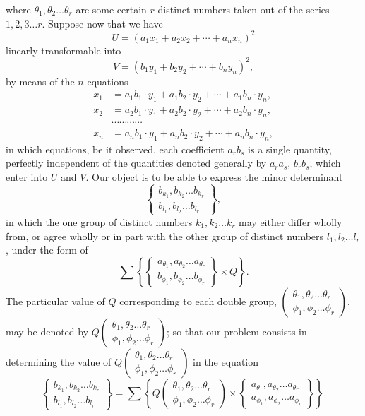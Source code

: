 \documentclass[11pt]{article}
\newcommand{\sourcepage}[1]{\marginpar{\scriptsize p.~#1}}
\newcommand{\bd}[2]{\left\{\begin{matrix}#1\\#2\end{matrix}\right\}}
\begin{document}
{{\sourcepage{244}
where $\theta_1,\theta_2\ldots\theta_r$ are some certain $r$ distinct numbers taken out of the series $1,2,3\ldots r$. Suppose now that we have
\[
U=(a_1x_1+a_2x_2+\cdots+a_nx_n)^2
\]
linearly transformable into
\[
V=(b_1y_1+b_2y_2+\cdots+b_ny_n)^2,
\]
by means of the $n$ equations
\[
\begin{aligned}
x_1&=a_1b_1\cdot y_1+a_1b_2\cdot y_2+\cdots+a_1b_n\cdot y_n,\\
x_2&=a_2b_1\cdot y_1+a_2b_2\cdot y_2+\cdots+a_2b_n\cdot y_n,\\
&\cdots\cdots\cdots\cdots\\
x_n&=a_nb_1\cdot y_1+a_nb_2\cdot y_2+\cdots+a_nb_n\cdot y_n,
\end{aligned}
\]
in which equations, be it observed, each coefficient $a_rb_s$ is a single quantity, perfectly independent of the quantities denoted generally by $a_ra_s$, $b_rb_s$, which enter into $U$ and $V$. Our object is to be able to express the minor determinant
\[
\bd{b_{k_1},b_{k_2}\ldots b_{k_r}}{b_{l_1},b_{l_2}\ldots b_{l_r}},
\]
in which the one group of distinct numbers $k_1,k_2\ldots k_r$ may either differ wholly from, or agree wholly or in part with the other group of distinct numbers $l_1,l_2\ldots l_r$, under the form of
\[
\sum\left\{\bd{a_{\theta_1},a_{\theta_2}\ldots a_{\theta_r}}{b_{\phi_1},b_{\phi_2}\ldots b_{\phi_r}}\times Q\right\}.
\]
The particular value of $Q$ corresponding to each double group,
$\left(\begin{smallmatrix}\theta_1,\theta_2\ldots\theta_r\\ \phi_1,\phi_2\ldots\phi_r\end{smallmatrix}\right)$,
may be denoted by $Q\left(\begin{smallmatrix}\theta_1,\theta_2\ldots\theta_r\\ \phi_1,\phi_2\ldots\phi_r\end{smallmatrix}\right)$; so that our problem consists in determining the value of $Q\left(\begin{smallmatrix}\theta_1,\theta_2\ldots\theta_r\\ \phi_1,\phi_2\ldots\phi_r\end{smallmatrix}\right)$ in the equation
\[
\bd{b_{k_1},b_{k_2}\ldots b_{k_r}}{b_{l_1},b_{l_2}\ldots b_{l_r}}
=
\sum\left\{Q\left(\begin{matrix}\theta_1,\theta_2\ldots\theta_r\\ \phi_1,\phi_2\ldots\phi_r\end{matrix}\right)
\times \bd{a_{\theta_1},a_{\theta_2}\ldots a_{\theta_r}}{a_{\phi_1},a_{\phi_2}\ldots a_{\phi_r}}\right\}.
\]}}
\end{document}
